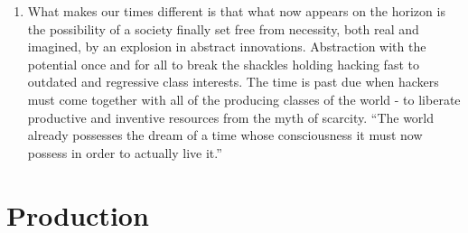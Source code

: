 \documentclass[letterpaper,12pt,english]{sphinxmanual}
\begin{document}
\begin{enumerate}
\item {} 
What makes our times different is that what now appears on the horizon is the possibility of a society finally set free from necessity, both real and imagined, by an explosion in abstract innovations. Abstraction with the potential once and for all to break the shackles holding hacking fast to outdated and regressive class interests. The time is past due when hackers must come together with all of the producing classes of the world - to liberate productive and inventive resources from the myth of scarcity. ``The world already possesses the dream of a time whose consciousness it must now possess in order to actually live it.''

\end{enumerate}


\section{Production}
\end{document}

